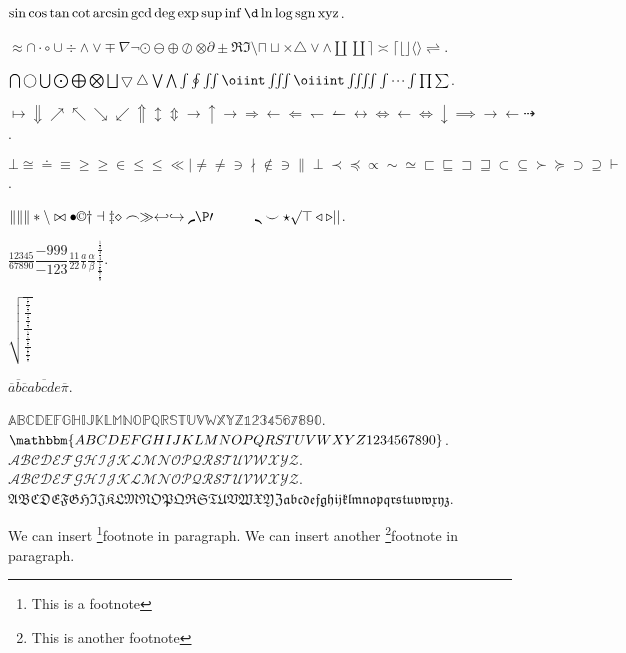 \documentclass{ctexbook}
\DeclareMathOperator{\sgn}{sgn}
\begin{document}
\(\sin \cos \tan \cot \arcsin \gcd \deg \exp \sup \inf \d \ln \log \sgn \operatorname{xyz}\).

\(\approx \cap \cdot \circ \cup \div \land \lor \mp \nabla \neg \odot \ominus \oplus \oslash \otimes \partial
	\pm \Re \Im \setminus \sqcap \sqcup \times \triangle \vee \wedge \amalg \coprod \rceil \asymp \lceil \lfloor
\rfloor \langle \rangle \rightleftharpoons \).

\(\bigcap \bigcirc \bigcup \bigodot \bigoplus \bigotimes \bigsqcup \bigtriangledown \bigtriangleup \bigvee
\bigwedge \int \oint \iint \oiint \iiint \oiiint \iiiint \idotsint \prod \sum \).

\(\mapsto \Downarrow \nearrow \nwarrow \searrow \swarrow \Uparrow \updownarrow \Updownarrow \to \uparrow
	\rightarrow \Rightarrow \leftarrow \Leftarrow \leftharpoondown \leftharpoonup \leftrightarrow \Leftrightarrow
\gets \iff \downarrow \implies \longrightarrow \longleftarrow \dashrightarrow\).

\(\bot \cong \doteq \equiv \ge \geq \in \le \leq \ll \mid \ne \neq \ni \nmid \notin \owns \parallel \perp
	\prec \preceq \propto \sim \simeq \sqsubset \sqsubseteq \sqsupset \sqsupseteq \subset \subseteq \succ \succeq
\supset \supseteq \vdash \).

\(\| \lVert \rVert \ast \backslash \bowtie \bullet \copyright \dagger \dashv \ddagger \diamond \frown \gg
	\hookleftarrow \hookrightarrow \lmoustache \P \prime \quad \qquad \rmoustache \smile \star \surd \top
\triangleleft \triangleright \lvert \rvert \).

\(\frac{12345}{67890} \dfrac{-999}{-123} \tfrac{11}{22} \frac{a}{b} \frac{\alpha}{\beta}
\frac{\frac{\frac{1}{2}}{\frac{3}{4}}}{\frac{\frac{5}{6}}{\frac{7}{8}}}\).

\(\sqrt{\frac{\frac{\frac{\frac{1}{1}}{\frac{2}{2}}}{\frac{\frac{3}{3}}{\frac{4}{4}}}}{\frac{\frac{\frac{5}{5}}{\frac{6}{6}}}{\frac{\frac{7}{7}}{\frac{8}{8}}}}}\)

\(\overline{a} \overline{b} \overline{c} \overline{abcde}  \overline{\pi} \).

\(\mathbb{ABCDEFGHIJKLMNOPQRSTUVWXYZ1234567890} \).
\(\mathbbm{ABCDEFGHIJKLMNOPQRSTUVWXYZ1234567890} \).
\(\mathcal{ABCDEFGHIJKLMNOPQRSTUVWXYZ}\).
\(\mathscr{ABCDEFGHIJKLMNOPQRSTUVWXYZ}\).
\(\mathfrak{ABCDEFGHIJKLMNOPQRSTUVWXYZabcdefghijklmnopqrstuvwxyz}\).

We can insert \footnote{This is a footnote}{footnote} in paragraph.
We can insert another \footnote{This is another footnote}{footnote} in paragraph.
\end{document}

